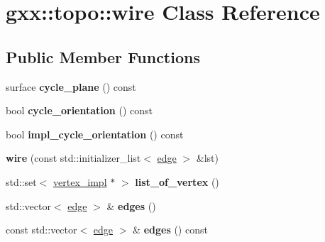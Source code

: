 \hypertarget{classgxx_1_1topo_1_1wire}{}\section{gxx\+:\+:topo\+:\+:wire Class Reference}
\label{classgxx_1_1topo_1_1wire}
\subsection*{Public Member Functions}
\begin{DoxyCompactItemize}
\item 
surface {\bfseries cycle\+\_\+plane} () const \hypertarget{classgxx_1_1topo_1_1wire_a804a4a4f15e2f909d6ebf20c67438e87}{}\label{classgxx_1_1topo_1_1wire_a804a4a4f15e2f909d6ebf20c67438e87}

\item 
bool {\bfseries cycle\+\_\+orientation} () const \hypertarget{classgxx_1_1topo_1_1wire_a6bbcc669a4e41c2e90db98c2c26a3901}{}\label{classgxx_1_1topo_1_1wire_a6bbcc669a4e41c2e90db98c2c26a3901}

\item 
bool {\bfseries impl\+\_\+cycle\+\_\+orientation} () const \hypertarget{classgxx_1_1topo_1_1wire_ae665de8168e09e7d62a871dc5f69c2ca}{}\label{classgxx_1_1topo_1_1wire_ae665de8168e09e7d62a871dc5f69c2ca}

\item 
{\bfseries wire} (const std\+::initializer\+\_\+list$<$ \hyperlink{classgxx_1_1topo_1_1edge}{edge} $>$ \&lst)\hypertarget{classgxx_1_1topo_1_1wire_a4055e3f2a3d5870a1034b1894f667e66}{}\label{classgxx_1_1topo_1_1wire_a4055e3f2a3d5870a1034b1894f667e66}

\item 
std\+::set$<$ \hyperlink{classgxx_1_1topo_1_1vertex__impl}{vertex\+\_\+impl} $\ast$ $>$ {\bfseries list\+\_\+of\+\_\+vertex} ()\hypertarget{classgxx_1_1topo_1_1wire_a39d00d87aecebeed0f6ef4a1c1c079e1}{}\label{classgxx_1_1topo_1_1wire_a39d00d87aecebeed0f6ef4a1c1c079e1}

\item 
std\+::vector$<$ \hyperlink{classgxx_1_1topo_1_1edge}{edge} $>$ \& {\bfseries edges} ()\hypertarget{classgxx_1_1topo_1_1wire_af87e060ff78eb4eb5402e6fe47fb58bb}{}\label{classgxx_1_1topo_1_1wire_af87e060ff78eb4eb5402e6fe47fb58bb}

\item 
const std\+::vector$<$ \hyperlink{classgxx_1_1topo_1_1edge}{edge} $>$ \& {\bfseries edges} () const \hypertarget{classgxx_1_1topo_1_1wire_a0c69d93372998b41d19a333e5e01cadf}{}\label{classgxx_1_1topo_1_1wire_a0c69d93372998b41d19a333e5e01cadf}

\end{DoxyCompactItemize}
